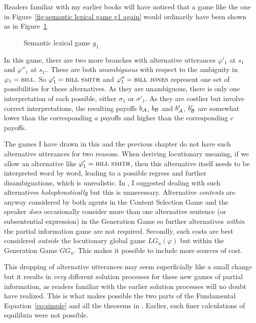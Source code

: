 Readers familiar with my earlier books will have noticed that a game like the one in Figure~\ref{fig:semantic lexical game g1 again} would ordinarily have been shown as in Figure~\ref{fig:old semantic lexical game g1}.

\begin{figure}[h] 

\caption{Semantic lexical game $g_1$}
\label{fig:old semantic lexical game g1}
\end{figure}

In this game, there are two more branches with alternative utterances $\varphi'_1$ at $s_1$ and $\varphi''_1$ at $s_{1'}$. These are both \emph{unambiguous} with respect to the ambiguity in $\varphi_1 = \Expression{bill}$. So $\varphi'_1 = \Expression{bill smith}$ and $\varphi''_1 = \Expression{bill jones}$ represent one set of possibilities for these alternatives. As they are unambiguous, there is only one interpretation of each possible, either $\sigma_1$ or $\sigma'_1$. As they are costlier but involve correct interpretations, the resulting payoffs $b_{\cal A}$, $b_{\cal B}$ and $b'_{\cal A}$, $b'_{\cal B}$ are somewhat lower than the corresponding $a$ payoffs and higher than the corresponding $c$ payoffs.

The games I have drawn in this and the previous chapter do not have such alternative utterances for two reasons. When deriving locutionary meaning, if we allow an alternative like $\varphi'_1 = \Expression{bill smith}$, then this alternative itself needs to be interpreted word by word, leading to a possible regress and further disambiguations, which is unrealistic. In \citet[88 and 120--121]{parikh:le}, I suggested dealing with such alternatives \emph{holophrastically} but this is unnecessary. Alternative \emph{contents} are anyway considered by both agents in the Content Selection Game and the speaker \emph{does} occasionally consider more than one alternative sentence (or subsentential expression) in the Generation Game so further alternatives \emph{within} the partial information game are not required. Secondly, such costs are best considered \emph{outside} the locutionary global game $LG_u(\varphi)$ but within the Generation Game $GG_u$. This makes it possible to include more sources of cost.

This dropping of alternative utterances may seem superficially like a small change but it results in \emph{very} different solution processes for these new games of partial information, as readers familiar with the earlier solution processes will no doubt have realized. This is what makes possible the two parts of the Fundamental Equation~\ref{eq:simple} and all the theorems in . Earlier, such finer calculations of equilibria were not possible.


